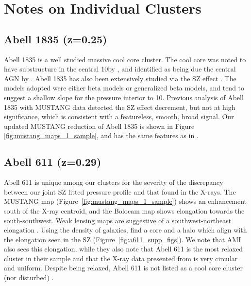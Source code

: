\section{Notes on Individual Clusters}
\label{sec:pp_constraints}


\subsection{Abell 1835 (z=0.25)}
\label{sec:results_a1835}


Abell 1835 is a well studied massive cool core cluster. The cool core was noted to have substructure in the central
10\asecs by \citet{schmidt2001}, and identified as being due the central AGN by \citet{mcnamara2006}. Abell 1835 has also
been extensively studied via the SZ effect \citep{reese2002,benson2004,bonamente2006,sayers2011,mauskopf2012}. The models adopted
were either beta models or generalized beta models, and tend to suggest a shallow slope for the pressure interior
to 10\asec. Previous analysis of Abell 1835 with MUSTANG data \citep{korngut2011} detected the SZ effect decrement, but not
at high significance, which is consistent with a featureless, smooth, broad signal. Our updated MUSTANG reduction
of Abell 1835 is shown in Figure \ref{fig:mustang_maps_1_sample}, and has the same features as in \citet{korngut2011}.


\subsection{Abell 611 (z=0.29)}
\label{sec:results_a611}


Abell 611 is unique among our clusters for the severity of the discrepancy between our joint SZ fitted pressure
profile and that found in the X-rays. The MUSTANG map (Figure~\ref{fig:mustang_maps_1_sample}) shows an enhancement
south of the X-ray centroid, and the Bolocam map shows elongation towards the south-southwest. Weak lensing maps
are suggestive of a southwest-northeast elongation \citep{newman2009, zitrin2015}.
Using the density of galaxies, \citet{lemze2013} find a core and a halo which align with the elongation seen 
in the SZ (Figure~\ref{fig:a611_supp_figs}). We note that AMI
\citep{hurley-walker2012} also sees this elongation, while they also note that Abell 611 is the most relaxed
cluster in their sample and that the X-ray data presented from \citet{laroque2006} is very circular and uniform.
Despite being relaxed, Abell 611 is not listed as a cool core cluster (nor disturbed) \citep{sayers2013}.

